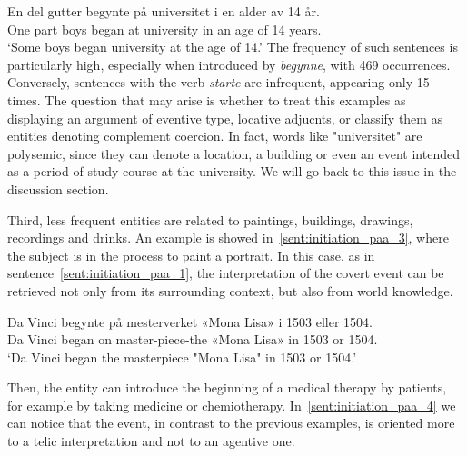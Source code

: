 \documentclass{article}
\begin{document}
        \gll En del gutter begynte på universitet i en alder av 14 år.\\
             One part boys began at university in an age of 14 years.\\
        \glt ‘Some boys began university at the age of 14.’
        \z
The frequency of such sentences is particularly high, especially when introduced by \emph{begynne}, with 469 occurrences. Conversely, sentences with the verb \emph{starte} are infrequent, appearing only 15 times. 
The question that may arise is whether to treat this examples as displaying an argument of eventive type, locative adjucnts, or classify them as entities denoting complement coercion. In fact, words like "universitet" are polysemic, since they can denote a location, a building or even an event intended as a period of study course at the university.  We will go back to this issue in the discussion section.

Third, less frequent entities are related to paintings, buildings, drawings, recordings and drinks. An example is showed in~\ref{sent:initiation_paa_3}, where the subject is in the process to paint a portrait. In this case, as in sentence~\ref{sent:initiation_paa_1}, the interpretation of the covert event can be retrieved not only from its surrounding context, but also from world knowledge. 

    \ea \label{sent:initiation_paa_3} %

    \gll Da Vinci begynte på mesterverket «Mona Lisa» i 1503 eller 1504.\\
         Da Vinci began on master-piece-the «Mona Lisa» in 1503 or 1504.\\
    \glt ‘Da Vinci began the masterpiece "Mona Lisa" in 1503 or 1504.’
    \z

Then, the entity can introduce the beginning of a medical therapy by patients, for example by taking medicine or chemiotherapy. In~\ref{sent:initiation_paa_4} we can notice that the event, in contrast to the previous examples, is oriented more to a telic interpretation and not to an agentive one.
    \ea \label{sent:initiation_paa_4} %
\end{document}
